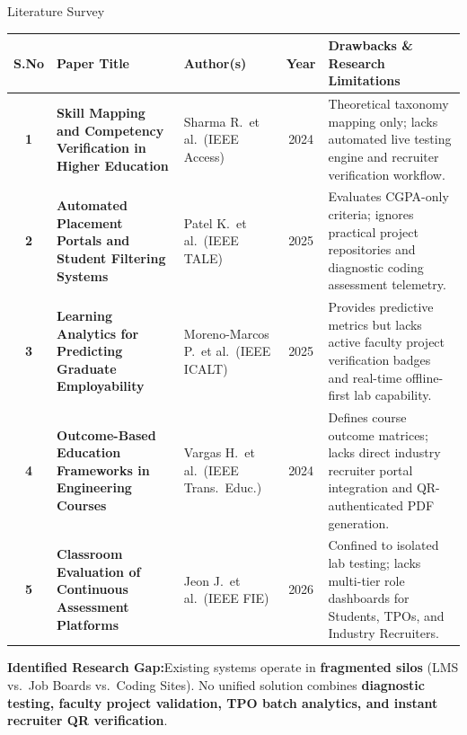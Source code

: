\documentclass[aspectratio=169,10pt,xcolor={table,dvipsnames}]{beamer}
\begin{document}
\begin{frame}[t]{Literature Survey}
  \vspace{-0.1cm}
  \centering
  {\fontsize{5.8}{7.2}\selectfont
  \renewcommand{\arraystretch}{1.10}
  \begin{tabular}{|c|>{\raggedright\arraybackslash\sloppy}p{4.0cm}|>{\raggedright\arraybackslash\sloppy}p{2.2cm}|c|>{\raggedright\arraybackslash\sloppy}p{4.6cm}|}
    \hline
    \rowcolor{LightSilver}
    \textbf{S.No} & \textbf{Paper Title} & \textbf{Author(s)} & \textbf{Year} & \textbf{Drawbacks \& Research Limitations}\\
    \hline
    \textbf{1} &
    \textbf{Skill Mapping and Competency Verification in Higher Education} &
    Sharma R.\ et al.\ (IEEE Access) & 2024 &
    Theoretical taxonomy mapping only; lacks automated live testing engine and recruiter verification workflow.\\
    \hline
    \rowcolor{LightSilver}
    \textbf{2} &
    \textbf{Automated Placement Portals and Student Filtering Systems} &
    Patel K.\ et al.\ (IEEE TALE) & 2025 &
    Evaluates CGPA-only criteria; ignores practical project repositories and diagnostic coding assessment telemetry.\\
    \hline
    \textbf{3} &
    \textbf{Learning Analytics for Predicting Graduate Employability} &
    Moreno-Marcos P.\ et al.\ (IEEE ICALT) & 2025 &
    Provides predictive metrics but lacks active faculty project verification badges and real-time offline-first lab capability.\\
    \hline
    \rowcolor{LightSilver}
    \textbf{4} &
    \textbf{Outcome-Based Education Frameworks in Engineering Courses} &
    Vargas H.\ et al.\ (IEEE Trans.\ Educ.) & 2024 &
    Defines course outcome matrices; lacks direct industry recruiter portal integration and QR-authenticated PDF generation.\\
    \hline
    \textbf{5} &
    \textbf{Classroom Evaluation of Continuous Assessment Platforms} &
    Jeon J.\ et al.\ (IEEE FIE) & 2026 &
    Confined to isolated lab testing; lacks multi-tier role dashboards for Students, TPOs, and Industry Recruiters.\\
    \hline
  \end{tabular}}

  \vspace{0.10cm}
  \begin{tcolorbox}[
    enhanced,colback=LightSilver,colframe=BorderColor,
    arc=2pt,boxrule=0.7pt,
    left=6pt,right=6pt,top=3pt,bottom=3pt]
    \centering\fontsize{6.5}{7.8}\selectfont
    \textbf{\color{Navy}Identified Research Gap:}\;Existing systems operate in \textbf{fragmented silos} (LMS vs.\ Job Boards vs.\ Coding Sites). No unified solution combines \textbf{diagnostic testing, faculty project validation, TPO batch analytics, and instant recruiter QR verification}.
  \end{tcolorbox}
\end{frame}
\end{document}
